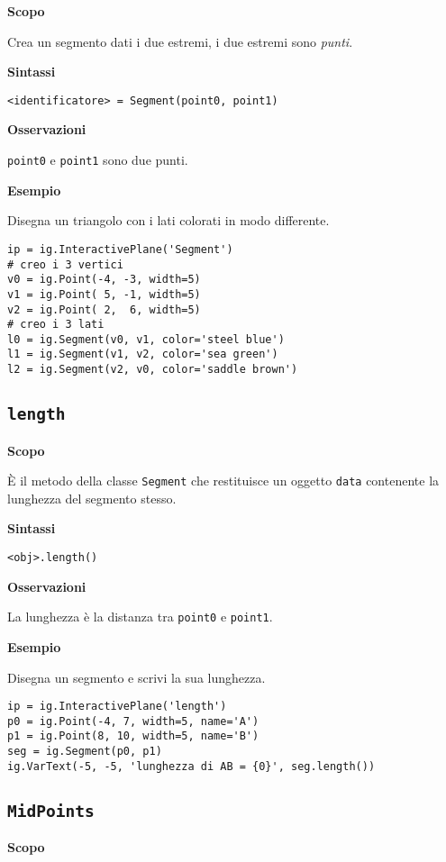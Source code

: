 \textbf{Scopo}

Crea un segmento dati i due estremi, i due estremi sono \emph{punti}.

\textbf{Sintassi}

\begin{lstlisting}
<identificatore> = Segment(point0, point1)
\end{lstlisting}

\textbf{Osservazioni}

\texttt{point0} e \texttt{point1} sono due punti.

\textbf{Esempio}

Disegna un triangolo con i lati colorati in modo differente.

\begin{lstlisting}
ip = ig.InteractivePlane('Segment')
# creo i 3 vertici
v0 = ig.Point(-4, -3, width=5)
v1 = ig.Point( 5, -1, width=5)
v2 = ig.Point( 2,  6, width=5)
# creo i 3 lati
l0 = ig.Segment(v0, v1, color='steel blue')
l1 = ig.Segment(v1, v2, color='sea green')
l2 = ig.Segment(v2, v0, color='saddle brown')
\end{lstlisting}


\subsection{\texttt{length}}
\label{sub:geoint_length}
\textbf{Scopo}

È il metodo della classe \texttt{Segment} che restituisce un oggetto 
\texttt{data}
contenente la lunghezza del segmento stesso.

\textbf{Sintassi}

\begin{lstlisting}
<obj>.length()
\end{lstlisting}

\textbf{Osservazioni}

La lunghezza è la distanza tra \texttt{point0} e \texttt{point1}.

\textbf{Esempio}

Disegna un segmento e scrivi la sua lunghezza.

\begin{lstlisting}
ip = ig.InteractivePlane('length')
p0 = ig.Point(-4, 7, width=5, name='A')
p1 = ig.Point(8, 10, width=5, name='B')
seg = ig.Segment(p0, p1)
ig.VarText(-5, -5, 'lunghezza di AB = {0}', seg.length())
\end{lstlisting}


\subsection{\texttt{MidPoints}}
\label{sub:geoint_midpoints}
\textbf{Scopo}

